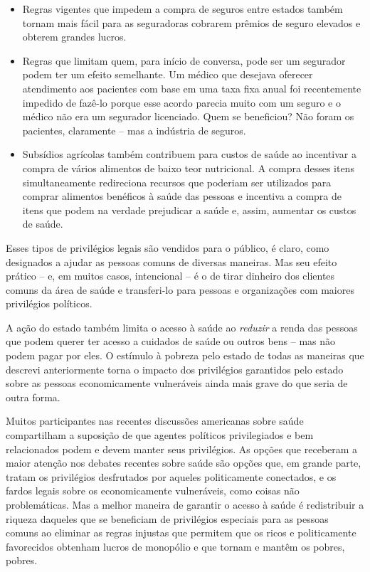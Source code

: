 \begin{itemize}
\item Regras vigentes que impedem a compra de seguros entre estados também tornam mais fácil para as seguradoras cobrarem prêmios de seguro elevados e obterem grandes lucros.

\item Regras que limitam quem, para início de conversa, pode ser um segurador podem ter um efeito semelhante. Um médico que desejava oferecer atendimento aos pacientes com base em uma taxa fixa anual foi recentemente impedido de fazê-lo porque esse acordo parecia muito com um seguro e o médico não era um segurador licenciado. Quem se beneficiou? Não foram os pacientes, claramente -- mas a indústria de seguros.

\item Subsídios agrícolas também contribuem para custos de saúde ao incentivar a compra de vários alimentos de baixo teor nutricional. A compra desses itens simultaneamente redireciona recursos que poderiam ser utilizados para comprar alimentos benéficos à saúde das pessoas e incentiva a compra de itens que podem na verdade prejudicar a saúde e, assim, aumentar os custos de saúde.
\end{itemize}

Esses tipos de privilégios legais são vendidos para o público, é claro, como designados a ajudar as pessoas comuns de diversas maneiras. Mas seu efeito prático -- e, em muitos casos, intencional -- é o de tirar dinheiro dos clientes comuns da área de saúde e transferi-lo para pessoas e organizações com maiores privilégios políticos.

A ação do estado também limita o acesso à saúde ao \emph{reduzir} a renda das pessoas que podem querer ter acesso a cuidados de saúde ou outros bens -- mas não podem pagar por eles. O estímulo à pobreza pelo estado de todas as maneiras que descrevi anteriormente torna o impacto dos privilégios garantidos pelo estado sobre as pessoas economicamente vulneráveis ainda mais grave do que seria de outra forma.

Muitos participantes nas recentes discussões americanas sobre saúde compartilham a suposição de que agentes políticos privilegiados e bem relacionados podem e devem manter seus privilégios. As opções que receberam a maior atenção nos debates recentes sobre saúde são opções que, em grande parte, tratam os privilégios desfrutados por aqueles politicamente conectados, e os fardos legais sobre os economicamente vulneráveis, como coisas não problemáticas. Mas a melhor maneira de garantir o acesso à saúde é redistribuir a riqueza daqueles que se beneficiam de privilégios especiais para as pessoas comuns ao eliminar as regras injustas que permitem que os ricos e politicamente favorecidos obtenham lucros de monopólio e que tornam e mantêm os pobres, pobres.

